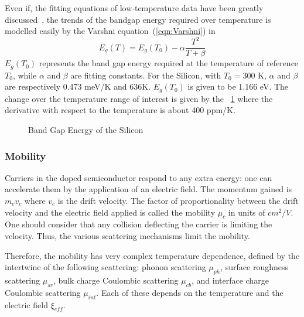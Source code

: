 Even if, the fitting equations of low-temperature data have been greatly discussed~\cite{Varshni1967,Allen1976,Manoogian1979,Donnell1991}, the trends of the bandgap energy required over temperature is modelled easily by the Varshni equation~(\ref{eqn:Varshni}) in~\cite{Varshni1967}
\begin{equation}
\label{eqn:Varshni}
E_g(T) = E_g(T_0) - \alpha \frac{T^2}{T+\beta}
\end{equation}
\(E_g(T_0) \) represents the band gap energy required at the temperature of reference \(T_0 \), while \(\alpha \) and \(\beta \) are fitting constants. For the Silicon, with \(T_0 = \)300 K, \(\alpha \) and \(\beta \) are respectively 0.473 meV/K and 636K. \(E_g(T_0) \) is given to be 1.166 eV. The change over the temperature range of interest is given by the \figurename~\ref{fig:bandgap} where the derivative with respect to the temperature is about 400 ppm/K.

\begin{figure}[!ht]
    \centering
    
    \caption{Band Gap Energy of the Silicon}
    \label{fig:bandgap}
\end{figure}

\subsubsection{Mobility}               %
\label{sec:mobility}
Carriers in the doped semiconductor respond to any extra energy: one can accelerate them by the application of an electric field. The momentum gained is \(m_c v_c \) where \(v_c \) is the drift velocity. The factor of proportionality between the drift velocity and the electric field applied is called the mobility \(\mu_c \) in units of \(cm^2/V \). One should consider that any collision deflecting the carrier is limiting the velocity. Thus, the various scattering mechanisms limit the mobility.

Therefore, the mobility has very complex temperature dependence, defined by the intertwine of the following scattering: phonon scattering \(\mu_{ph} \), surface roughness scattering \(\mu_{sr} \), bulk charge Coulombic scattering \(\mu_{cb} \), and interface charge Coulombic scattering \(\mu_{int} \). Each of these depends on the temperature and the electric field \(\xi_{eff} \).

